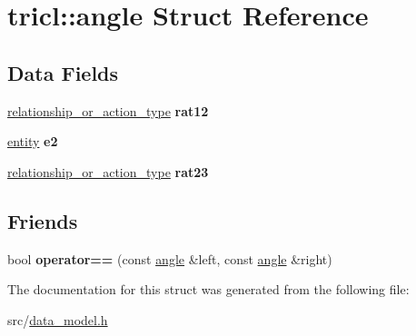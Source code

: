 \hypertarget{structtricl_1_1angle}{}\section{tricl\+:\+:angle Struct Reference}
\label{structtricl_1_1angle}
\subsection*{Data Fields}
\begin{DoxyCompactItemize}
\item 
\mbox{\label{structtricl_1_1angle_af850c72e4b4b69131e171984213e306d}} 
\hyperlink{data__model_8h_a2d01894944fb58a8fedc0912a48d13f8}{relationship\+\_\+or\+\_\+action\+\_\+type} {\bfseries rat12}
\item 
\mbox{\label{structtricl_1_1angle_ac03e3d590e5228ebf4a5137ec72a7219}} 
\hyperlink{data__model_8h_a57273122278e8b301844e2a2e1f0742f}{entity} {\bfseries e2}
\item 
\mbox{\label{structtricl_1_1angle_af0ec7d54e4d93cbf5df891dcc8397453}} 
\hyperlink{data__model_8h_a2d01894944fb58a8fedc0912a48d13f8}{relationship\+\_\+or\+\_\+action\+\_\+type} {\bfseries rat23}
\end{DoxyCompactItemize}
\subsection*{Friends}
\begin{DoxyCompactItemize}
\item 
\mbox{\label{structtricl_1_1angle_a08af3ce953cf2a9246fc60278c929a52}} 
bool {\bfseries operator==} (const \hyperlink{structtricl_1_1angle}{angle} \&left, const \hyperlink{structtricl_1_1angle}{angle} \&right)
\end{DoxyCompactItemize}


The documentation for this struct was generated from the following file\+:\begin{DoxyCompactItemize}
\item 
src/\hyperlink{data__model_8h}{data\+\_\+model.\+h}\end{DoxyCompactItemize}
